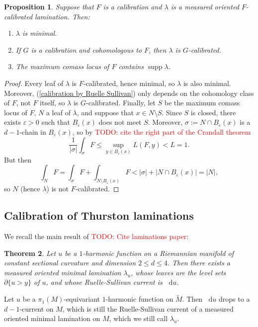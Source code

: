 \documentclass[reqno,11pt]{amsart}
\newcommand*\dif{\mathop{}\!\mathrm{d}}
\DeclareMathOperator{\supp}{supp}
\newtheorem{theorem}{Theorem}[section]
\newtheorem{proposition}[theorem]{Proposition}
\theoremstyle{definition}
\numberwithin{equation}{section}
\newcommand\todo[1]{\textcolor{red}{TODO: #1}}
\begin{document}
\begin{proposition}\label{properties of calibrated laminations}
Suppose that $F$ is a calibration and $\lambda$ is a measured oriented $F$-calibrated lamination.
Then:
\begin{enumerate}
\item $\lambda$ is minimal.
\item If $G$ is a calibration and cohomologous to $F$, then $\lambda$ is $G$-calibrated.
\item The maximum comass locus of $F$ contains $\supp \lambda$.
\end{enumerate}
\end{proposition}
\begin{proof}
Every leaf of $\lambda$ is $F$-calibrated, hence minimal, so $\lambda$ is also minimal.
Moreover, (\ref{calibration by Ruelle Sullivan}) only depends on the cohomology class of $F$, not $F$ itself, so $\lambda$ is $G$-calibrated.
Finally, let $S$ be the maximum comass locus of $F$, $N$ a leaf of $\lambda$, and suppose that $x \in N \setminus S$.
Since $S$ is closed, there exists $\varepsilon > 0$ such that $B_\varepsilon(x)$ does not meet $S$.
Moreover, $\sigma := N \cap B_\varepsilon(x)$ is a $d-1$-chain in $B_\varepsilon(x)$, so by \todo{cite the right part of the Crandall theorem}
$$\frac{1}{|\sigma|} \int_\sigma F \leq \sup_{y \in B_\varepsilon(x)} L(F, y) < L = 1.$$
But then 
$$\int_N F = \int_\sigma F + \int_{N \setminus B_\varepsilon(x)} F < |\sigma| + |N \cap B_\varepsilon(x)| = |N|,$$
so $N$ (hence $\lambda$) is not $F$-calibrated.
\end{proof}


\subsection{Calibration of Thurston laminations}
We recall the main result of \todo{Cite laminations paper}:

\begin{theorem}
Let $u$ be a $1$-harmonic function on a Riemannian manifold of constant sectional curvature and dimension $2 \leq d \leq 4$.
Then there exists a measured oriented minimal lamination $\lambda_u$, whose leaves are the level sets $\partial \{u > y\}$ of $u$, and whose Ruelle-Sullivan current is $\dif u$.
\end{theorem}

Let $u$ be a $\pi_1(M)$-equivariant $1$-harmonic function on $\tilde M$.
Then $\dif u$ drops to a $d-1$-current on $M$, which is still the Ruelle-Sullivan current of a measured oriented minimal lamination on $M$, which we still call $\lambda_u$.
\end{document}
